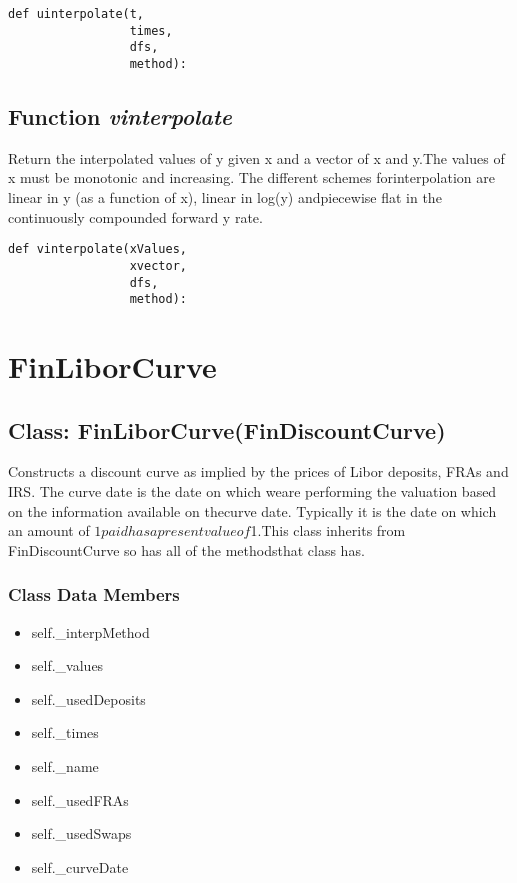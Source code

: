\documentclass[twoside,11pt]{book}
\begin{document}
\begin{lstlisting}
def uinterpolate(t,
                 times,
                 dfs,
                 method):
\end{lstlisting}

\subsection{Function {\it vinterpolate}}
Return the interpolated values of y given x and a vector of x and y.The values of x must be monotonic and increasing. The different schemes forinterpolation are linear in y (as a function of x), linear in log(y) andpiecewise flat in the continuously compounded forward y rate. 

\begin{lstlisting}
def vinterpolate(xValues,
                 xvector,
                 dfs,
                 method):
\end{lstlisting}

\newpage
\section{FinLiborCurve}

\subsection{Class: FinLiborCurve(FinDiscountCurve)}
Constructs a discount curve as implied by the prices of Libor deposits, FRAs and IRS. The curve date is the date on which weare performing the valuation based on the information available on thecurve date. Typically it is the date on which an amount of $1 paidhas a present value of $1.This class inherits from FinDiscountCurve so has all of the methodsthat class has. 

\subsubsection{Class Data Members}
\begin{itemize}
\item{self.\_interpMethod}
\item{self.\_values}
\item{self.\_usedDeposits}
\item{self.\_times}
\item{self.\_name}
\item{self.\_usedFRAs}
\item{self.\_usedSwaps}
\item{self.\_curveDate}
\end{itemize}
\end{document}
